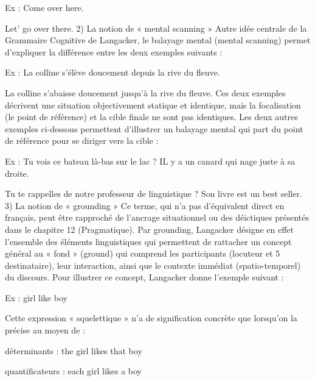 Ex : Come over here.\par

Let’ go over there. 2) La notion de « mental scanning » Autre idée centrale de la Grammaire Cognitive de Langacker, le balayage mental (mental scanning) permet d’expliquer la différence entre les deux exemples suivants :\par

Ex : La colline s'élève doucement depuis la rive du fleuve.\par

La colline s’abaisse doucement jusqu’à la rive du fleuve. Ces deux exemples décrivent une situation objectivement statique et identique, mais la focalisation (le point de référence) et la cible finale ne sont pas identiques. Les deux autres exemples ci-dessous permettent d'illustrer un balayage mental qui part du point de référence pour se diriger vers la cible :\par

Ex : Tu vois ce bateau là-bas sur le lac ? IL y a un canard qui nage juste à sa droite.\par

Tu te rappelles de notre professeur de linguistique ? Son livre est un best seller. 3) La notion de « grounding » Ce terme, qui n’a pas d’équivalent direct en français, peut être rapproché de l’ancrage situationnel ou des déictiques présentés dans le chapitre 12 (Pragmatique). Par grounding, Langacker désigne en effet l’ensemble des éléments linguistiques qui permettent de rattacher un concept général au « fond » (ground) qui comprend les participants (locuteur et 5 destinataire), leur interaction, ainsi que le contexte immédiat (spatio-temporel) du discours. Pour illustrer ce concept, Langacker donne l’exemple suivant :\par

Ex : girl like boy\par

Cette expression « squelettique » n'a de signification concrète que lorsqu’on la précise au moyen de :\par

\noindent{\color{BellaTeal}$\diamond$}\hspace{.6em}déterminants : the girl likes that boy\par

\noindent{\color{BellaTeal}$\diamond$}\hspace{.6em}quantificateurs : each girl likes a boy\par

